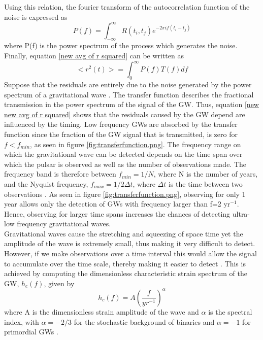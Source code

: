 \documentclass[12pt]{article}
\begin{document}
	Using this relation, the fourier transform of the autocorrelation function of the noise is expressed as
	\begin{equation}
	P(f)=\int_{-\infty}^{\infty}R(t_i,t_j)e^{-2 \pi i f(t_i-t_j)}
	\end{equation}
	where P(f) is the power spectrum of the process which generates the noise. Finally, equation \ref{new avg of r squared} can be written as 
	\begin{equation}\label{new new avg of r squared}
	<r^{2}(t)>=\int_{0}^{\infty}P(f)T(f)df
	\end{equation}
	Suppose that the residuals are entirely due to the noise generated by the power spectrum of a gravitational wave \cite{blandford1976arrival}. The transfer function describes the fractional transmission in the power spectrum of the signal of the GW. Thus, equation \ref{new new avg of r squared} shows that the residuals caused by the GW depend are influenced by the timing. Low frequency GWs are absorbed by the transfer function since the fraction of the GW signal that is transmitted, is zero for $f<f_{min}$, as seen in figure \ref{fig:transferfunction.png}. The frequency range on which the gravitational wave can be detected \cite{hobbs2009international} depends on the time span over which the pulsar is observed as well as the number of observations made. The frequency band is therefore between $f_{min}=1/N$, where N is the number of years, and the Nyquist frequency, $f_{max}=1/{2\Delta t}$, where $\Delta t$ is the time between two observations \cite{sesana2010gravitational}. As seen in figure \ref{fig:transferfunction.png}, observing for only 1 year allows only the detection of GWs with frequency larger than f=2 yr$^{-1}$. Hence, observing for larger time spans increases the chances of detecting ultra-low frequency gravitational waves. \\ Gravitational waves cause the stretching and squeezing of space time yet the amplitude of the wave is extremely small, thus making it very difficult to detect. However, if we make observations over a time interval this would allow the signal to accumulate over the time scale, thereby making it easier to detect \cite{moore2014gravitational}. This is achieved by computing the dimensionless characteristic strain spectrum of the GW, $h_{c}(f)$, given by \cite{moore2014gravitational}
	\begin{equation}\label{charac strain}
	h_{c}(f)=A (\frac{f}{yr^{-1}})^{\alpha}
	\end{equation}
	where A is the dimensionless strain amplitude of the wave and $\alpha$ is the spectral index, with $\alpha=-2/3$ for the stochastic background of binaries \cite{moore2014gravitational} and $\alpha=-1$ for primordial GWs \cite{zhao2013constraints}.\\
\end{document}
